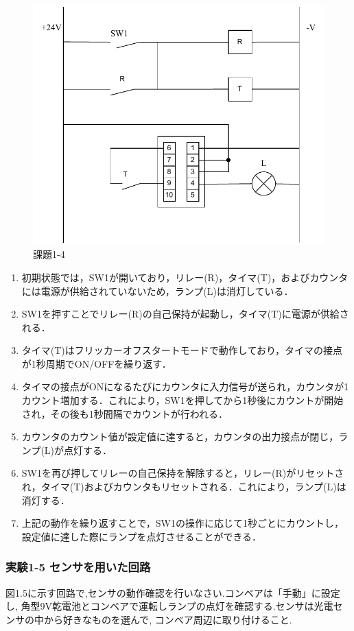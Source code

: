 \begin{figure}[H]
  \centering
  \includegraphics[scale=0.5]{sozai/17.pdf}
  \caption{課題1-4}
\end{figure}

\begin{enumerate}
  \item 初期状態では，SW1が開いており，リレー(R)，タイマ(T)，およびカウンタには電源が供給されていないため，ランプ(L)は消灯している．
  \item SW1を押すことでリレー(R)の自己保持が起動し，タイマ(T)に電源が供給される．
  \item タイマ(T)はフリッカーオフスタートモードで動作しており，タイマの接点が1秒周期でON/OFFを繰り返す．
  \item タイマの接点がONになるたびにカウンタに入力信号が送られ，カウンタが1カウント増加する．これにより，SW1を押してから1秒後にカウントが開始され，その後も1秒間隔でカウントが行われる．
  \item カウンタのカウント値が設定値に達すると，カウンタの出力接点が閉じ，ランプ(L)が点灯する．
  \item SW1を再び押してリレーの自己保持を解除すると，リレー(R)がリセットされ，タイマ(T)およびカウンタもリセットされる．これにより，ランプ(L)は消灯する．
  \item 上記の動作を繰り返すことで，SW1の操作に応じて1秒ごとにカウントし，設定値に達した際にランプを点灯させることができる．
\end{enumerate}


\subsubsection{実験1-5 センサを用いた回路}
図1.5に示す回路で,センサの動作確認を行いなさい.コンベアは「手動」に設定し,
角型9V乾電池とコンベアで運転しランプの点灯を確認する.センサは光電センサの中から好きなものを選んで,
コンベア周辺に取り付けること.

